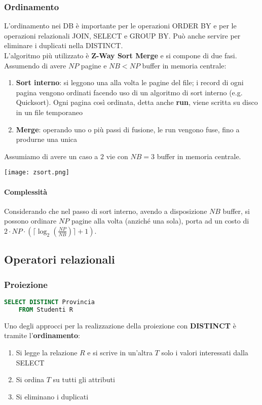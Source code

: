 \subsubsection{Ordinamento}
L'ordinamento nei DB è importante per le operazioni ORDER BY e per le operazioni relazionali JOIN, SELECT e GROUP BY. Può anche servire per eliminare i duplicati nella DISTINCT.\\
L'algoritmo più utilizzato è \textbf{Z-Way Sort Merge} e si compone di due fasi. Assumendo di avere $NP$ pagine e $NB < NP$ buffer in memoria centrale:
\begin{enumerate}
	\item \textbf{Sort interno}: si leggono una alla volta le pagine del file; i record di ogni pagina vengono ordinati facendo uso di un algoritmo di sort interno (e.g. Quicksort). Ogni pagina così ordinata, detta anche \textbf{run}, viene scritta su disco in un file temporaneo
	\item \textbf{Merge}: operando uno o più passi di fusione, le run vengono fuse, fino a produrne una unica
\end{enumerate}

\begin{example}
	Assumiamo di avere un caso a $2$ vie con $NB = 3$ buffer in memoria centrale.
	\begin{center}
		\texttt{[image: zsort.png]}
	\end{center}
\end{example}

\paragraph{Complessità}
Considerando che nel passo di sort interno, avendo a disposizione $NB$ buffer, si possono ordinare $NP$ pagine alla volta (anziché una sola), porta ad un costo di $2 \cdot NP \cdot (\lceil \log_2(\frac{NP}{NB})\rceil + 1)$.

\subsection{Operatori relazionali}
\subsubsection{Proiezione}
\begin{lstlisting}[language=SQL]
	SELECT DISTINCT Provincia
	FROM Studenti R
\end{lstlisting}
Uno degli approcci per la realizzazione della proiezione con \textbf{DISTINCT} è tramite l'\textbf{ordinamento}:
\begin{enumerate}
	\item Si legge la relazione $R$ e si scrive in un'altra $T$ solo i valori interessati dalla SELECT
	\item Si ordina $T$ su tutti gli attributi
	\item Si eliminano i duplicati
\end{enumerate}

